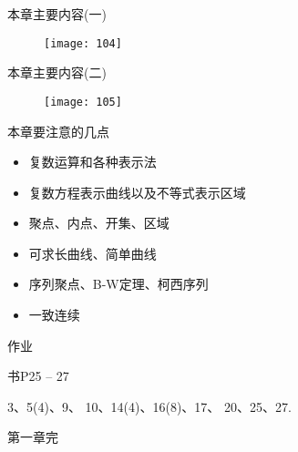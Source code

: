 \documentclass{beamer}
\begin{document}
\begin{frame}{本章主要内容(一)}
\begin{figure}
\texttt{[image: 104]}
\end{figure}
\end{frame}

\begin{frame}{本章主要内容(二)}
\begin{figure}
	\texttt{[image: 105]}
\end{figure}
\end{frame}

\begin{frame}{本章要注意的几点}
\begin{itemize}
	\item 复数运算和各种表示法
	\item 复数方程表示曲线以及不等式表示区域
	
	\item 聚点、内点、开集、区域
	
	\item 可求长曲线、简单曲线
	
	\item 序列聚点、B-W定理、柯西序列
	
	\item 一致连续
	
\end{itemize}
\end{frame}

\begin{frame}{作业}
\huge

书P25 -- 27

\bigskip

3、5(4)、9、 10、14(4)、16(8)、17、 20、25、27.

\end{frame}

\begin{frame}{}

\Huge
\centering
\vfill
第一章\qquad 完
\vfill

\end{frame}
\end{document}
